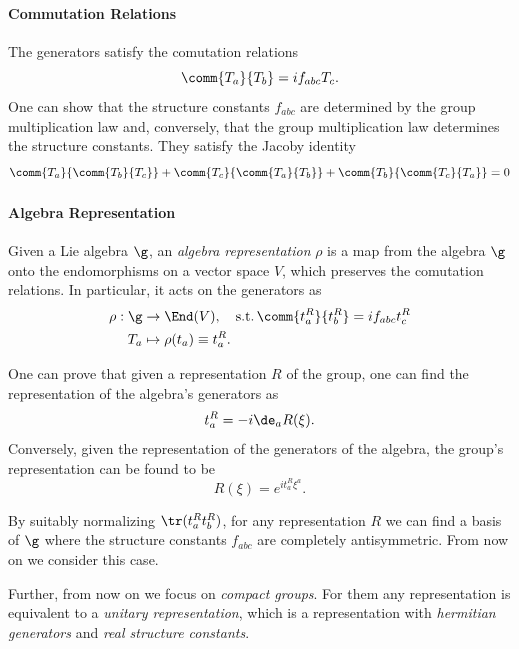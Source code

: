 \paragraph{Commutation Relations}
The generators satisfy the comutation relations
\begin{equation}
    \comm{T_a}{T_b} = i f_{abc} T_c .
\end{equation}
One can show that the structure constants $f_{abc}$ are determined by the group multiplication law and, conversely, that the group multiplication law determines the structure constants. They satisfy the Jacoby identity
\begin{equation}
    \comm{T_a}{\comm{T_b}{T_c}} + \comm{T_c}{\comm{T_a}{T_b}} + \comm{T_b}{\comm{T_c}{T_a}} = 0
\end{equation}

\paragraph{Algebra Representation}
Given a Lie algebra $\g$, an \emph{algebra representation} $\rho$ is a map from the algebra $\g$ onto the endomorphisms on a vector space $V$, which preserves the comutation relations. In particular, it acts on the generators as
\begin{equation}
\begin{aligned}
    \rho: \g &\to \End(V), \quad \textup{s.t.} \, \comm{t^R_a}{t^R_b} = i f_{abc} t^R_c \\
    T_a &\mapsto \rho(t_a) \equiv t^R_a .
\end{aligned}
\end{equation}

One can prove that given a representation $R$ of the group, one can find the representation of the algebra's generators as 
\begin{equation}
    t^R_a = -i \de_a R(\xi).
\end{equation}
Conversely, given the representation of the generators of the algebra, the group's representation can be found to be
\begin{equation}\label{appeq:rep-ga}
    R(\xi) = e^{i t^R_a \xi^a} .
\end{equation}

By suitably normalizing $\tr(t^R_a t^R_b)$, for any representation $R$ we can find a basis of $\g$ where the structure constants $f_{abc}$ are completely antisymmetric. From now on we consider this case.

Further, from now on we focus on \emph{compact groups}. For them any representation is equivalent to a \emph{unitary representation}, which is a representation with \emph{hermitian generators} and \emph{real structure constants}.

